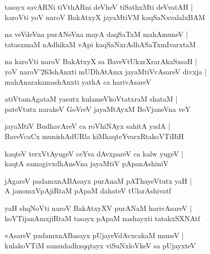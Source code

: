 \begin{shloka}
tasayx savARNi tiVthARni deVheV tiSathxMti deVvatAH |\\
karoVti yoV naroV BakAtxyX jayaMtiVM kaqSaNxvalalxBAM
\end{shloka}

\begin{shloka}
na veVdeVna purANeVna mayA daqSaTxM mahAmuneV |\\
tatasxmaM nAdhikaM vApi kaqSaNxrAdhASaTxmIvarxtaM
\end{shloka}

\begin{shloka}
na karoVti naroV BakAtxyX sa BaveVtUkxrXrarAkaSxsaH |\\
yoV naroV\char'263shAnxti mUDhAtAmx jayaMtiVvAsareV divxja |\\
mahAnarakamashAnxti yathA ca harivAsareV 
\end{shloka}

\begin{shloka}
atiVtamAgataM yasutx kulameVkoVtatxraM shataM |\\
pateVtutx narakeV GoVreV jayaMtAyxM BoVjaneVna veY
\end{shloka}

\begin{shloka}
jayaMtiV BudhavAreV ca roVhiNAyx sahitA yadA |\\
BaveVcaCx munishAdURla kiMkaqteYvarxRtakoVTiBiH
\end{shloka}

\begin{shloka}
kaqteV terxVtAyugeV ceYva dAvxpareV ca kalw yugeV |\\
kaqtA samagivxdhAneVna jayaMtiV pApanAshiniV
\end{shloka}

\begin{shloka}
jAgareV padamxnABAsayx purAnaM pAThayeVtutx yaH |\\
A janomxVpAjiRtaM pApaM dahateV tUlarAshivatf
\end{shloka}

\begin{shloka}
yaH shqNoVti naroV BakAtxyXV purANaM harivAsareV |\\
koVTijanAmxjiRtaM tasayx pApaM nashayxti tatakxSXNAtf
\end{shloka}

\begin{shloka}
vAsareV padamxnABasayx pUjayeVdAvxcakaM muneV |\\
kulakoVTiM samudadhxqqtayx viSuNxloVkeV sa pUjayxteV 
\end{shloka}

